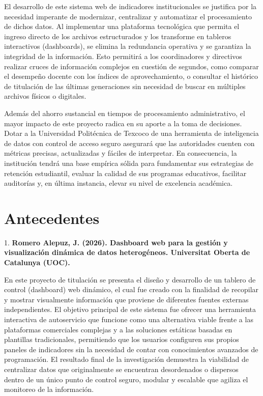 El desarrollo de este sistema web de indicadores institucionales se justifica por la necesidad imperante de modernizar, centralizar y automatizar el procesamiento de dichos datos. Al implementar una plataforma tecnológica que permita el ingreso directo de los archivos estructurados y los transforme en tableros interactivos (dashboards), se elimina la redundancia operativa y se garantiza la integridad de la información. Esto permitirá a los coordinadores y directivos realizar cruces de información complejos en cuestión de segundos, como comparar el desempeño docente con los índices de aprovechamiento, o consultar el histórico de titulación de las últimas generaciones sin necesidad de buscar en múltiples archivos físicos o digitales.

Además del ahorro sustancial en tiempos de procesamiento administrativo, el mayor impacto de este proyecto radica en su aporte a la toma de decisiones. Dotar a la Universidad Politécnica de Texcoco de una herramienta de inteligencia de datos con control de acceso seguro asegurará que las autoridades cuenten con métricas precisas, actualizadas y fáciles de interpretar. En consecuencia, la institución tendrá una base empírica sólida para fundamentar sus estrategias de retención estudiantil, evaluar la calidad de sus programas educativos, facilitar auditorías y, en última instancia, elevar su nivel de excelencia académica.


\section{Antecedentes}


1. \textbf{Romero Alepuz, J. (2026). Dashboard web para la gestión y visualización dinámica de datos heterogéneos. Universitat Oberta de Catalunya (UOC).}

En este proyecto de titulación se presenta el diseño y desarrollo de un tablero de control (dashboard) web dinámico, el cual fue creado con la finalidad de recopilar y mostrar visualmente información que proviene de diferentes fuentes externas independientes. 
El objetivo principal de este sistema fue ofrecer una herramienta interactiva de autoservicio que funcione como una alternativa viable frente a las plataformas comerciales complejas y a las soluciones estáticas basadas en plantillas tradicionales, permitiendo que los usuarios configuren sus propios paneles de 
indicadores sin la necesidad de contar con conocimientos avanzados de programación. El resultado final de la investigación demuestra la viabilidad de centralizar datos que originalmente se encuentran desordenados o dispersos dentro de un único punto de control seguro, modular y escalable que  
agiliza el monitoreo de la información.


